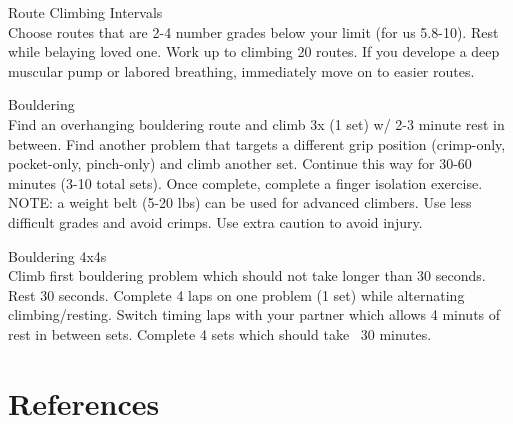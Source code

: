 \documentclass[12pt, letterpaper]{article}
\begin{document}
\item Route Climbing Intervals \\ 
Choose routes that are 2-4 number grades below your limit (for us 5.8-10). 
Rest while belaying loved one. Work up to climbing 20 routes. If you develope 
a deep muscular pump or labored breathing, immediately move on to easier routes.

\item Bouldering \\ 
Find an overhanging bouldering route and climb 3x (1 set) w/ 2-3 minute rest
in between. Find another problem that targets a different grip position
(crimp-only, pocket-only, pinch-only) and climb another set. 
Continue this way for 30-60 minutes (3-10 total sets).
Once complete, complete a finger isolation exercise.
NOTE: a weight belt (5-20 lbs) can be used for advanced climbers. 
Use less difficult grades and avoid crimps. Use extra caution to avoid injury.

\item Bouldering 4x4s \\ 
Climb first bouldering problem which should not take longer than 
30 seconds. Rest 30 seconds. Complete 4 laps on one problem (1 set)
while alternating climbing/resting. Switch timing laps with your partner
which allows 4 minuts of rest in between sets. Complete 4 sets which
should take ~30 minutes.






\section{References}
\printbibliography[heading=none] 
\end{document}
